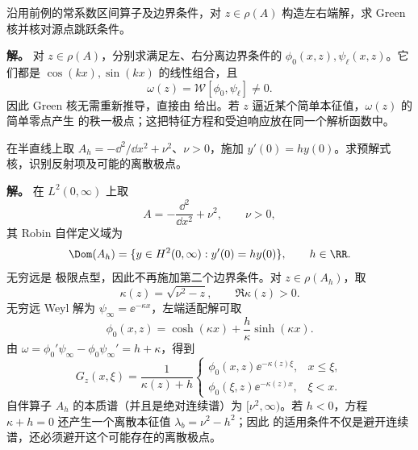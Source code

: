 \begin{exbox}
\label{ex:math-sl-green-robin-constant}
沿用前例的常系数区间算子及边界条件，对 $z\in\rho(A)$ 构造左右端解，求 Green 核并核对源点跳跃条件。

\textbf{解。} 对 $z\in\rho(A)$，分别求满足左、右分离边界条件的 $\phi_0(x,z),\psi_\ell(x,z)$。它们都是 $\cos(kx),\sin(kx)$ 的线性组合，且
\[
 \omega(z)=\mathcal W[\phi_0,\psi_\ell]\neq0.
\]
因此 Green 核无需重新推导，直接由 给出。若 $z$ 逼近某个简单本征值，$\omega(z)$ 的简单零点产生 的秩一极点；这把特征方程和受迫响应放在同一个解析函数中。
\end{exbox}
\begin{exbox}[半直线常势算子的预解式核]
\label{ex:math-sl-halfline-resolvent}
在半直线上取 $A_h=-\dd^2/\dd x^2+\nu^2$、$\nu>0$，施加 $y\prime(0)=hy(0)$。求预解式核，识别反射项及可能的离散极点。

\textbf{解。} 在 $L^2(0,\infty)$ 上取
\[
 A=-\frac{\dd^2}{\dd x^2}+\nu^2,
 \qquad \nu>0,
\]
其 Robin 自伴定义域为
\[
 \Dom(A_h)=\{y\in H^2(0,\infty):y'(0)=hy(0)\},
 \qquad h\in\RR.
\]
无穷远是 极限点型，因此不再施加第二个边界条件。对 $z\in\rho(A_h)$，取
\[
 \kappa(z)=\sqrt{\nu^2-z},\qquad \Re\kappa(z)>0.
\]
无穷远 Weyl 解为 $\psi_\infty=\ee^{-\kappa x}$，左端适配解可取
\[
 \phi_0(x,z)=\cosh(\kappa x)+\frac{h}{\kappa}\sinh(\kappa x).
\]
由 $\omega=\phi_0'\psi_\infty-\phi_0\psi_\infty'=h+\kappa$，得到
\begin{equation}\label{eq:math-sl-halfline-explicit-green}
 G_z(x,\xi)=\frac{1}{\kappa(z)+h}
 \begin{cases}
 \phi_0(x,z)\ee^{-\kappa(z)\xi},&x\le\xi,\\
 \phi_0(\xi,z)\ee^{-\kappa(z)x},&\xi<x.
 \end{cases}
\end{equation}
自伴算子 $A_h$ 的本质谱（并且是绝对连续谱）为 $[\nu^2,\infty)$。若 $h<0$，方程 $\kappa+h=0$ 还产生一个离散本征值 $\lambda_b=\nu^2-h^2$；因此 的适用条件不仅是避开连续谱，还必须避开这个可能存在的离散极点。
\end{exbox}

